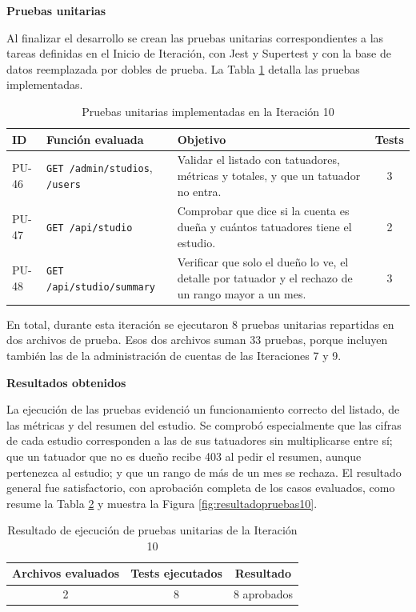 \documentclass[12pt,letterpaper,oneside]{report}
\newcommand{\titulopar}[1]{\par\textbf{#1}\par}
\begin{document}
\vspace{\parskip}
\titulopar{Pruebas unitarias}
Al finalizar el desarrollo se crean las pruebas unitarias correspondientes a las tareas definidas en el Inicio de Iteración, con Jest y Supertest y con la base de datos reemplazada por dobles de prueba. La Tabla \ref{tab:pruebas10} detalla las pruebas implementadas.

\begin{table}[H]
  \centering
  \caption{Pruebas unitarias implementadas en la Iteración 10}
  \label{tab:pruebas10}
  \renewcommand{\arraystretch}{1.2}
  \begin{tabular}{|l|p{3.4cm}|p{6.6cm}|c|}
    \hline
    \textbf{ID} & \textbf{Función evaluada} & \textbf{Objetivo} & \textbf{Tests} \\
    \hline
    PU-46 & \texttt{GET /admin/\newline studios}, \texttt{/users} & Validar el listado con tatuadores, métricas y totales, y que un tatuador no entra. & 3 \\ \hline
    PU-47 & \texttt{GET /api/studio} & Comprobar que dice si la cuenta es dueña y cuántos tatuadores tiene el estudio. & 2 \\ \hline
    PU-48 & \texttt{GET /api/studio/\newline summary} & Verificar que solo el dueño lo ve, el detalle por tatuador y el rechazo de un rango mayor a un mes. & 3 \\ \hline
  \end{tabular}
\end{table}

En total, durante esta iteración se ejecutaron 8 pruebas unitarias repartidas en dos archivos de prueba. Esos dos archivos suman 33 pruebas, porque incluyen también las de la administración de cuentas de las Iteraciones 7 y 9.

\titulopar{Resultados obtenidos}
La ejecución de las pruebas evidenció un funcionamiento correcto del listado, de las métricas y del resumen del estudio. Se comprobó especialmente que las cifras de cada estudio corresponden a las de sus tatuadores sin multiplicarse entre sí; que un tatuador que no es dueño recibe 403 al pedir el resumen, aunque pertenezca al estudio; y que un rango de más de un mes se rechaza. El resultado general fue satisfactorio, con aprobación completa de los casos evaluados, como resume la Tabla \ref{tab:resultado10} y muestra la Figura \ref{fig:resultadopruebas10}.

\begin{table}[H]
  \centering
  \caption{Resultado de ejecución de pruebas unitarias de la Iteración 10}
  \label{tab:resultado10}
  \renewcommand{\arraystretch}{1.2}
  \begin{tabular}{|c|c|c|}
    \hline
    \textbf{Archivos evaluados} & \textbf{Tests ejecutados} & \textbf{Resultado} \\
    \hline
    2 & 8 & 8 aprobados \\ \hline
  \end{tabular}
\end{table}
\end{document}
